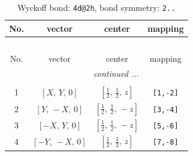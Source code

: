 \documentclass[fleqn,8pt]{jsarticle}
\begin{document}
\renewcommand{\arraystretch}{1.2}
\begin{longtable}{cccc}
\caption{Wyckoff bond: {\tt 4d@2h}, bond symmetry: {\tt 2..}}
 \\
 \hline \hline
No. & vector & center & mapping \\ \hline \endfirsthead

\multicolumn{3}{l}{\tablename\ \thetable{}} \\
 \hline \hline
No. & vector & center & mapping \\ \hline \endhead

 \hline \hline
\multicolumn{3}{r}{\footnotesize\it continued ...} \\ \endfoot

 \hline \hline
\multicolumn{3}{r}{} \\ \endlastfoot

1 & $\left[ X,\, Y,\, 0 \right]$ & $\left[ \frac{1}{2},\, \frac{1}{2},\, z \right]$ & {\tt [1,-2]} \\ \hline
2 & $\left[ Y,\, - X,\, 0 \right]$ & $\left[ \frac{1}{2},\, \frac{1}{2},\, - z \right]$ & {\tt [3,-4]} \\ \hline
3 & $\left[ - X,\, Y,\, 0 \right]$ & $\left[ \frac{1}{2},\, \frac{1}{2},\, - z \right]$ & {\tt [5,-6]} \\ \hline
4 & $\left[ - Y,\, - X,\, 0 \right]$ & $\left[ \frac{1}{2},\, \frac{1}{2},\, z \right]$ & {\tt [7,-8]} \\
\end{longtable}
\renewcommand{\arraystretch}{1.2}
\end{document}
